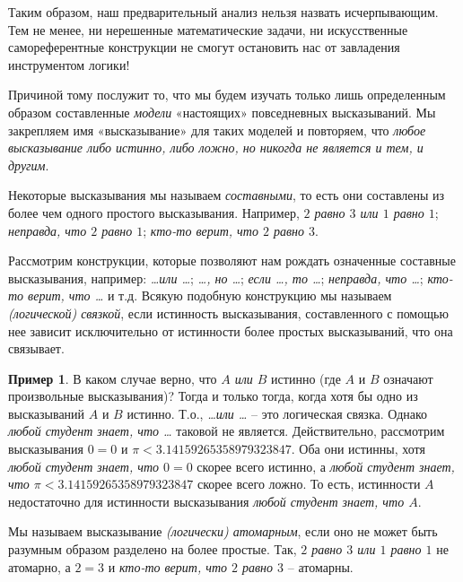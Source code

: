 \documentclass[12pt,notitlepage]{article}
\theoremstyle{plain}
\theoremstyle{definition}
\newtheorem{exm}[thm]{Пример}
\theoremstyle{plain}
\newcommand{\1}{\mathbf{1}}
\newcommand{\0}{\mathbf{0}}
\newcommand{\mcomm}[1]{}
\begin{document}
\mcomm{}

Таким образом, наш предварительный анализ нельзя назвать исчерпывающим. Тем не менее, ни нерешенные математические задачи, ни искусственные самореферентные конструкции не смогут остановить нас от завладения инструментом логики!

Причиной тому послужит то, что мы будем изучать только лишь определенным образом составленные \emph{модели} «настоящих» повседневных высказываний. Мы закрепляем имя «высказывание» для таких моделей и повторяем, что \emph{любое высказывание либо истинно, либо ложно, но никогда не является и тем, и другим}.

\medskip
Некоторые высказывания мы называем \emph{составными}, то есть они составлены из более чем одного простого высказывания. Например, \emph{$2$ равно $3$ или $1$ равно $1$}; \emph{неправда, что $2$ равно $1$}; \emph{кто-то верит, что $2$ равно $3$}.

Рассмотрим конструкции, которые позволяют нам рождать означенные составные высказывания, например: \emph{\dots или \dots}; \emph{\dots, но \dots}; \emph{если \dots, то \dots}; \emph{неправда, что \dots}; \emph{кто-то верит, что \dots} и т.д. Всякую подобную конструкцию мы называем \emph{(логической) связкой}, если истинность высказывания, составленного с помощью нее зависит исключительно от истинности более простых высказываний, что она связывает.
\begin{exm}\label{L1:exm_pi}
	В каком случае верно, что \emph{$A$ или $B$} истинно (где $A$ и $B$ означают произвольные высказывания)? Тогда и только тогда, когда хотя бы одно из высказываний  $A$ и $B$ истинно. Т.о., \emph{\dots или \dots} – это логическая связка. Однако \emph{любой студент знает, что \dots} таковой не является. Действительно, рассмотрим высказывания $0 = 0$ и $\pi < 3.14159265358979323847$. Оба они истинны, хотя \emph{любой студент знает, что $0 = 0$} скорее всего истинно, а \emph{любой студент знает, что $\pi < 3.14159265358979323847$} скорее всего ложно. То есть, истинности $A$ недостаточно для истинности высказывания \emph{любой студент знает, что $A$}.
\end{exm}

Мы называем высказывание \emph{(логически) атомарным}, если оно не может быть разумным образом разделено на более простые. Так, \emph{$2$ равно $3$ или $1$ равно $1$} не атомарно, а $2 = 3$ и \emph{кто-то верит, что $2$ равно $3$} – атомарны.
\end{document}
